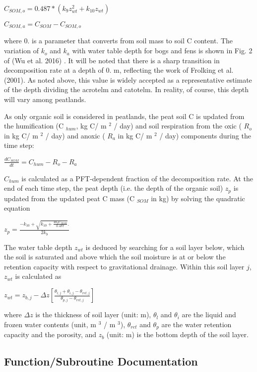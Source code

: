 $ C_{SOM,o}= 0.487\ast (k_{9}z_{wt}^{2}+k_{10}z_{wt}) $

$ C_{SOM,a}= C_{SOM}-C_{SOM,o} $

where 0. is a parameter that converts from soil mass to soil C content. The variation of $k_{o}$ and $k_{a}$ with water table depth for bogs and fens is shown in Fig. 2 of (Wu et al. 2016) \cite{Wu2016-zt}. It will be noted that there is a sharp transition in decomposition rate at a depth of 0. m, reflecting the work of Frolking et al. (2001). As noted above, this value is widely accepted as a representative estimate of the depth dividing the acrotelm and catotelm. In reality, of course, this depth will vary among peatlands.

As only organic soil is considered in peatlands, the peat soil C is updated from the humification (C $_{hum}$, kg C/ m $^2$ / day) and soil respiration from the oxic ( $R_o$ in kg C/ m $^2$ / day) and anoxic ( $R_a$ in kg C/ m $^2$ / day) components during the time step\+:

$ \frac{{dC}_{SOM}}{dt} = C_{hum}-R_{o}-R_{a} $

$C_{hum}$ is calculated as a P\+F\+T-\/dependent fraction of the decomposition rate. At the end of each time step, the peat depth (i.\+e. the depth of the organic soil) $z_p$ is updated from the updated peat C mass (C $_{SOM}$ in kg) by solving the quadratic equation

$ z_{p}= \frac{{-k}_{10}+\sqrt{k_{10}+\frac{4k_{9}{C}_{SOM}}{0.487}}. }{2k_{9}} $

The water table depth $z_{wt}$ is deduced by searching for a soil layer below, which the soil is saturated and above which the soil moisture is at or below the retention capacity with respect to gravitational drainage. Within this soil layer $j$, $z_{wt}$ is calculated as

$ z_{wt}=z_{{b},j}-\Delta z\left[ \frac{\theta_{{l},j}+\theta_{i,j}-\theta _{{ret},j}}{\theta_{{p},j}-\theta_{{ret},j}} \right] $

where $\Delta z $ is the thickness of soil layer (unit\+: m), $\theta_l $ and $\theta_i$ are the liquid and frozen water contents (unit, m $^3$ / m $^3$), $\theta_{ret}$ and $\theta_p$ are the water retention capacity and the porosity, and $z_b$ (unit\+: m) is the bottom depth of the soil layer. 

\subsection{Function/\+Subroutine Documentation}
\hypertarget{group__peat__soil__het__resp_gaed12b76ec8925a4bc3105f8ae7a36888}{}
